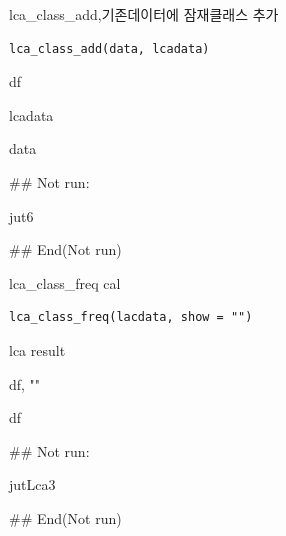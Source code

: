 \documentclass[a4paper]{book}
\begin{document}
%
\begin{Description}
lca\_class\_add,기존데이터에 잠재클래스 추가
\end{Description}
%
\begin{Usage}
\begin{verbatim}
lca_class_add(data, lcadata)
\end{verbatim}
\end{Usage}
%
\begin{Arguments}
\begin{ldescription}
\item[\code{data}] df

\item[\code{lcadata}] lcadata
\end{ldescription}
\end{Arguments}
%
\begin{Value}
data
\end{Value}
%
\begin{Examples}
\begin{ExampleCode}
\#\# Not run: 

jut6 %

## End(Not run)
\end{ExampleCode}
\end{Examples}

%
\begin{Description}
lca\_class\_freq cal
\end{Description}
%
\begin{Usage}
\begin{verbatim}
lca_class_freq(lacdata, show = "")
\end{verbatim}
\end{Usage}
%
\begin{Arguments}
\begin{ldescription}
\item[\code{lacdata}] lca result

\item[\code{show}] df, ""
\end{ldescription}
\end{Arguments}
%
\begin{Value}
df
\end{Value}
%
\begin{Examples}
\begin{ExampleCode}
\#\# Not run: 

 jutLca3 %

## End(Not run)
\end{ExampleCode}
\end{Examples}
\end{document}
